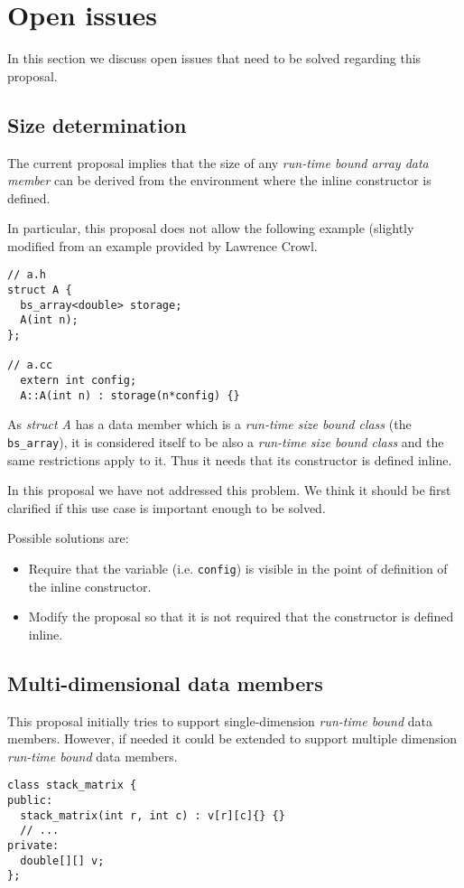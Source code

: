 \section{Open issues}

In this section we discuss open issues that need to be solved regarding this proposal.

\subsection{Size determination}

The current proposal implies that the size of any \emph{run-time bound array
data member} can be derived from the environment where the inline constructor is
defined.

In particular, this proposal does not allow the following example (slightly
modified from an example provided by Lawrence Crowl.

\begin{lstlisting}
// a.h
struct A {
  bs_array<double> storage;
  A(int n);
};

// a.cc
  extern int config;
  A::A(int n) : storage(n*config) {}
\end{lstlisting}

As \emph{struct A} has a data member which is a \emph{run-time size bound class}
(the \verb+bs_array+), it is considered itself to be also a \emph{run-time size
bound class} and the same restrictions apply to it. Thus it needs that its
constructor is defined inline.

In this proposal we have not addressed this problem. We think it should be first
clarified if this use case is important enough to be solved.

Possible solutions are:

\begin{itemize}

\item Require that the variable (i.e. \verb+config+) is visible in the point of definition of the
inline constructor.

\item Modify the proposal so that it is not required that the constructor is
defined inline.

\end{itemize}

\subsection{Multi-dimensional data members}

This proposal initially tries to support single-dimension \emph{run-time bound}
data members. However, if needed it could be extended to support multiple
dimension \emph{run-time bound} data members.

\begin{lstlisting}
class stack_matrix {
public:
  stack_matrix(int r, int c) : v[r][c]{} {}
  // ...
private:
  double[][] v;
};
\end{lstlisting}

